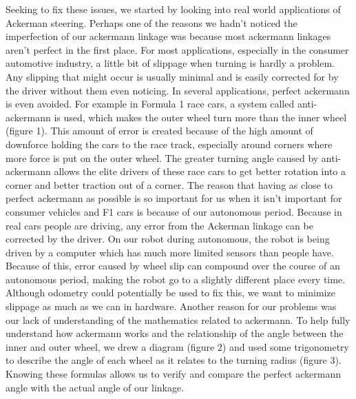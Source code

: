 Seeking to fix these issues, we started by looking into real world applications of Ackerman steering. Perhaps one of the reasons we hadn’t noticed the imperfection of our ackermann linkage was because most ackermann linkages aren’t perfect in the first place. For most applications, especially in the consumer automotive industry, a little bit of slippage when turning is hardly a problem. Any slipping that might occur is usually minimal and is easily corrected for by the driver without them even noticing. In several applications, perfect ackermann is even avoided. For example in Formula 1 race cars, a system called anti-ackermann is used, which makes the outer wheel turn more than the inner wheel (figure 1). This amount of error is created because of the high amount of downforce holding the cars to the race track, especially around corners where more force is put on the outer wheel. The greater turning angle caused by anti-ackermann allows the elite drivers of these race cars to get better rotation into a corner and better traction out of a corner. The reason that having as close to perfect ackermann as possible is so important for us when it isn’t important for consumer vehicles and F1 cars is because of our autonomous period. Because in real cars people are driving, any error from the Ackerman linkage can be corrected by the driver. On our robot during autonomous, the robot is being driven by a computer which has much more limited sensors than people have. Because of this, error caused by wheel slip can compound over the course of an autonomous period, making the robot go to a slightly different place every time. Although odometry could potentially be used to fix this, we want to minimize slippage as much as we can in hardware.
Another reason for our problems was our lack of understanding of the mathematics related to ackermann. To help fully understand how ackermann works and the relationship of the angle between the inner and outer wheel, we drew a diagram (figure 2) and used some trigonometry to describe the angle of each wheel as it relates to the turning radius (figure 3). Knowing these formulas allows us to verify and compare the perfect ackermann angle with the actual angle of our linkage.

